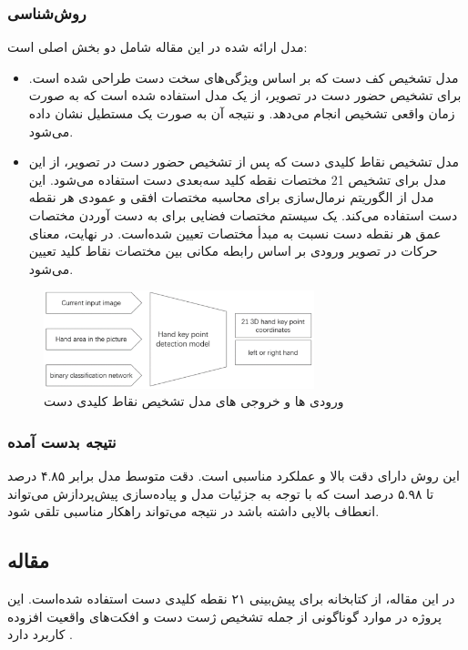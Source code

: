 \subsubsection{روش‌شناسی}
مدل ارائه شده در این مقاله شامل دو بخش اصلی است: 
\begin{itemize}
    \item مدل تشخیص کف دست که بر اساس ویژگی‌های سخت دست طراحی شده است. برای تشخیص حضور دست در تصویر، از یک مدل  استفاده شده است که به صورت زمان
    واقعی تشخیص انجام می‌دهد. و نتیجه آن به صورت یک مستطیل نشان داده می‌شود.
    \item    مدل تشخیص نقاط کلیدی دست که پس از تشخیص حضور دست در تصویر، از این مدل برای تشخیص 21 مختصات نقطه کلید سه‌بعدی دست استفاده می‌شود.  این مدل از الگوریتم نرمال‌سازی برای محاسبه مختصات افقی و عمودی هر نقطه 
    دست استفاده می‌کند. یک سیستم مختصات فضایی برای به دست آوردن مختصات عمق هر نقطه دست نسبت به مبدأ مختصات تعیین شده‌است. در نهایت، معنای حرکات در تصویر ورودی بر اساس رابطه مکانی بین مختصات نقاط کلید تعیین می‌شود.
     
\end{itemize}


\begin{figure}[h]
    \centering
    \includegraphics[width=0.7\textwidth]{keypoint.png}
    \caption{ورودی ها و خروجی های مدل تشخیص نقاط کلیدی دست}
\end{figure}

\subsubsection{نتیجه بدست آمده}
این روش دارای دقت بالا و عملکرد مناسبی است. دقت متوسط مدل برابر  ۴.۸۵ درصد تا ۵.۹۸ درصد است که با توجه به جزئیات مدل و پیاده‌سازی پیش‌پردازش می‌تواند انعطاف بالایی داشته باشد در نتیجه می‌تواند راهکار مناسبی تلقی شود.





\subsection{مقاله }
در این مقاله، از کتابخانه  برای پیش‌بینی ۲۱ نقطه کلیدی دست استفاده‌ ‌شده‌است. این پروژه در موارد گوناگونی از جمله تشخیص ژست دست و افکت‌های واقعیت افزوده  کاربرد دارد \cite{zhang2020mediapipe}.

